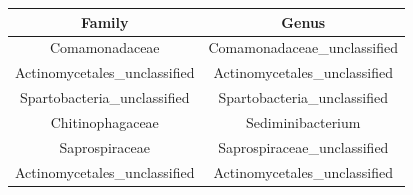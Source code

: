 \documentclass[]{article}
\begin{document}
\begin{longtable}[]{@{}cc@{}}
\toprule
\begin{minipage}[b]{0.41\columnwidth}\centering\strut
Family\strut
\end{minipage} & \begin{minipage}[b]{0.41\columnwidth}\centering\strut
Genus\strut
\end{minipage}\tabularnewline
\midrule
\endhead
\begin{minipage}[t]{0.41\columnwidth}\centering\strut
Comamonadaceae\strut
\end{minipage} & \begin{minipage}[t]{0.41\columnwidth}\centering\strut
Comamonadaceae\_unclassified\strut
\end{minipage}\tabularnewline
\begin{minipage}[t]{0.41\columnwidth}\centering\strut
Actinomycetales\_unclassified\strut
\end{minipage} & \begin{minipage}[t]{0.41\columnwidth}\centering\strut
Actinomycetales\_unclassified\strut
\end{minipage}\tabularnewline
\begin{minipage}[t]{0.41\columnwidth}\centering\strut
Spartobacteria\_unclassified\strut
\end{minipage} & \begin{minipage}[t]{0.41\columnwidth}\centering\strut
Spartobacteria\_unclassified\strut
\end{minipage}\tabularnewline
\begin{minipage}[t]{0.41\columnwidth}\centering\strut
Chitinophagaceae\strut
\end{minipage} & \begin{minipage}[t]{0.41\columnwidth}\centering\strut
Sediminibacterium\strut
\end{minipage}\tabularnewline
\begin{minipage}[t]{0.41\columnwidth}\centering\strut
Saprospiraceae\strut
\end{minipage} & \begin{minipage}[t]{0.41\columnwidth}\centering\strut
Saprospiraceae\_unclassified\strut
\end{minipage}\tabularnewline
\begin{minipage}[t]{0.41\columnwidth}\centering\strut
Actinomycetales\_unclassified\strut
\end{minipage} & \begin{minipage}[t]{0.41\columnwidth}\centering\strut
Actinomycetales\_unclassified\strut

\end{minipage}
\end{longtable}
\end{document}
